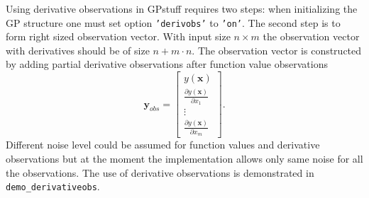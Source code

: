\documentclass[twoside,11pt]{article}
\newcommand{\code}[1]{{\normalfont\texttt{#1}}}
\begin{document}
Using derivative observations in GPstuff requires two steps: when
initializing the GP structure one must set option
\code{'derivobs'} to \code{'on'}. The second step is to form
right sized observation vector. With input size $n \times m$ the
observation vector with derivatives should be of size $n + m \cdot
n$. The observation vector is constructed by adding partial
derivative observations after function value observations
% 
\begin{equation}
  \textbf{y}_{obs} =
  \left[
    \begin{array}{c}
      y(\textbf{x})\\
      \frac{\partial y(\textbf{x})}{\partial x_1} \\
      \vdots\\
      \frac{\partial y(\textbf{x})}{\partial x_m}
    \end{array}
  \right].
\end{equation}
% 
Different noise level could be assumed for function values and
derivative observations but at the moment the implementation allows
only same noise for all the observations. The use of derivative
observations is demonstrated in \code{demo\_derivativeobs}.




\end{document}
